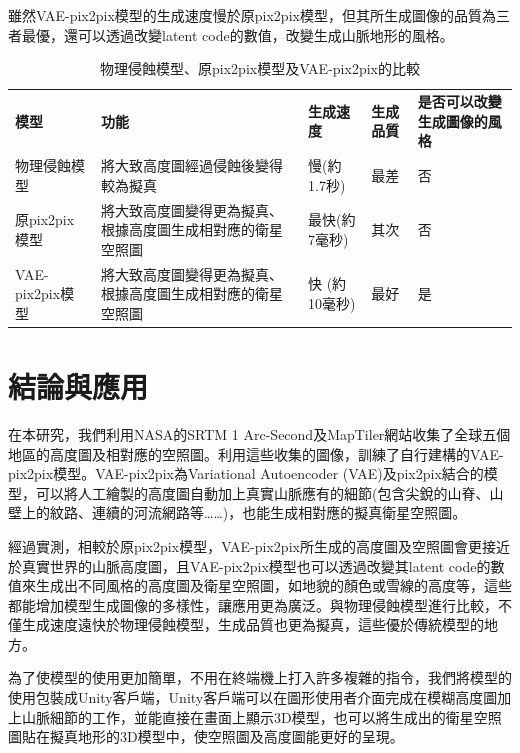 \documentclass[a4paper, 12pt]{article}
\begin{document}
雖然VAE-pix2pix模型的生成速度慢於原pix2pix模型，但其所生成圖像的品質為三者最優，還可以透過改變latent code的數值，改變生成山脈地形的風格。
\begin{table}[htbp]
    \caption{物理侵蝕模型、原pix2pix模型及VAE-pix2pix的比較}
    \label{tab:9}
    \begin{tabularx}{\linewidth}{|Y|Y|Y|Y|Y|}
        \hline
        \textbf{模型}   & \textbf{功能}                                              & \textbf{生成速度} & \textbf{生成品質} & \textbf{是否可以改變生成圖像的風格} \\ \hhline{|=|=|=|=|=|}
        物理侵蝕模型    & 將大致高度圖經過侵蝕後變得較為擬真                         & 慢(約1.7秒)       & 最差              & 否                                  \\ \hline
        原pix2pix模型   & 將大致高度圖變得更為擬真、根據高度圖生成相對應的衛星空照圖 & 最快(約7毫秒)     & 其次              & 否                                  \\ \hline
        VAE-pix2pix模型 & 將大致高度圖變得更為擬真、根據高度圖生成相對應的衛星空照圖 & 快 (約10毫秒)     & 最好              & 是                                  \\ \hline
    \end{tabularx}
\end{table}
\section{結論與應用}

在本研究，我們利用NASA的SRTM 1 Arc-Second及MapTiler網站收集了全球五個地區的高度圖及相對應的空照圖。利用這些收集的圖像，訓練了自行建構的VAE-pix2pix模型。VAE-pix2pix為Variational Autoencoder (VAE)及pix2pix結合的模型，可以將人工繪製的高度圖自動加上真實山脈應有的細節(包含尖銳的山脊、山壁上的紋路、連續的河流網路等……)，也能生成相對應的擬真衛星空照圖。

經過實測，相較於原pix2pix模型，VAE-pix2pix所生成的高度圖及空照圖會更接近於真實世界的山脈高度圖，且VAE-pix2pix模型也可以透過改變其latent code的數值來生成出不同風格的高度圖及衛星空照圖，如地貌的顏色或雪線的高度等，這些都能增加模型生成圖像的多樣性，讓應用更為廣泛。與物理侵蝕模型進行比較，不僅生成速度遠快於物理侵蝕模型，生成品質也更為擬真，這些優於傳統模型的地方。

為了使模型的使用更加簡單，不用在終端機上打入許多複雜的指令，我們將模型的使用包裝成Unity客戶端，Unity客戶端可以在圖形使用者介面完成在模糊高度圖加上山脈細節的工作，並能直接在畫面上顯示3D模型，也可以將生成出的衛星空照圖貼在擬真地形的3D模型中，使空照圖及高度圖能更好的呈現。
\end{document}
